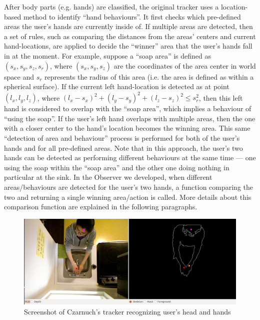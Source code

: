 After body parts (e.g. hands) are classified, the original tracker uses a location-based method to identify ``hand behaviours''. It first checks which pre-defined areas the user's hands are currently inside of. If multiple areas are detected, then a set of rules, such as comparing the distances from the areas' centers and current hand-locations, are applied to decide the ``winner'' area that the user's hands fall in at the moment. For example, suppose a ``soap area'' is defined as $(s_{x}, s_{y}, s_{z}, s_{r})$, where $(s_{x}, s_{y}, s_{z})$ are the coordinates of the area center in world space and $s_{r}$ represents the radius of this area (i.e. the area is defined as within a spherical surface). If the current left hand-location is detected as at point $(l_{x}, l_{y}, l_{z})$, where $(l_{x}-s_{x})^{2} + (l_{y}-s_{y})^{2} + (l_{z}-s_{z})^{2} \leqslant s_{r}^{2}$, then this left hand is considered to overlap with the ``soap area'', which implies a behaviour of ``using the soap''. If the user's left hand overlaps with multiple areas, then the one with a closer center to the hand's location becomes the winning area. This same ``detection of area and behaviour'' process is performed for both of the user's hands and for all pre-defined areas. Note that in this approach, the user's two hands can be detected as performing different behaviours at the same time --- one using the soap within the ``soap area'' and the other one doing nothing in particular at the sink. In the Observer we developed, when different areas/behaviours are detected for the user's two hands, a function comparing the two and returning a single winning area/action is called. More details about this comparison function are explained in the following paragraphs.

%
\begin{figure}[htb]
\centering
\includegraphics[width=0.9\linewidth]{fig/handtracker-performance.png}
\caption{Screenshot of Czarnuch's tracker recognizing user's head and hands}
\label{fig:handtracker-performance}
\end{figure}

